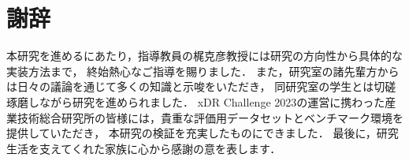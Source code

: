 \chapter*{謝辞}

本研究を進めるにあたり，指導教員の梶克彦教授には研究の方向性から具体的な実装方法まで，
終始熱心なご指導を賜りました．
また，研究室の諸先輩方からは日々の議論を通じて多くの知識と示唆をいただき，
同研究室の学生とは切磋琢磨しながら研究を進められました．
xDR Challenge 2023の運営に携わった産業技術総合研究所の皆様には，貴重な評価用データセットとベンチマーク環境を提供していただき，
本研究の検証を充実したものにできました．
最後に，研究生活を支えてくれた家族に心から感謝の意を表します．
